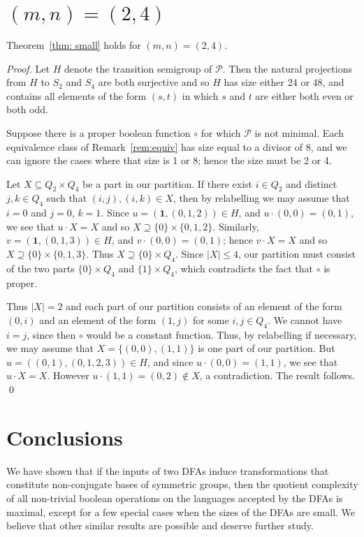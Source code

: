 \documentclass{llncs}
\newcommand{\cP}{{\mathcal P}}
\newcommand{\one}{{\mathbf 1}}
\begin{document}
\section{$(m,n)=(2,4)$}
\begin{proposition}
Theorem~\ref{thm: small} holds for $(m,n)=(2,4)$.
\end{proposition}
\begin{proof}
Let $H$ denote the transition semigroup of $\cP$.  Then the natural projections from $H$ to $S_2$ and $S_4$ are both surjective and so $H$ has size either $24$ or $48$, and  contains all elements of the form $(s,t)$ in which $s$ and $t$ are either both even or both odd.

Suppose there is a proper boolean function $\circ$ for which $\cP$ is not minimal.  
Each equivalence class of Remark~\ref{rem:equiv} has size equal to a divisor of $8$, and we can ignore the cases where that size is 1 or 8; hence the size must be 2 or 4. 

Let $X\subseteq Q_2\times Q_4$ be a part in our partition.  
If there exist $i\in Q_2$ and distinct $j,k\in Q_4$ such that $(i,j),(i,k)\in X$, then by relabelling we may assume that $i=0$ and $j=0$, $k=1$.  
Since $u=(\one, (0,1,2))\in H$, and $u\cdot (0,0)=(0,1)$, we see that $u\cdot X=X$ and so $X\supseteq \{0\}\times \{0,1,2\}$.  
Similarly, $v=(\one, (0,1,3))\in H$, and $v\cdot (0,0)=(0,1)$; hence $v\cdot X=X$ and so $X\supseteq \{0\}\times \{0,1,3\}$.  
Thus $X\supseteq \{0\}\times Q_4$.  
Since $|X|\le 4$, our partition must consist of the two parts $\{0\}\times Q_4$ and $\{1\}\times Q_4$, which contradicts the fact that $\circ$ is proper.  

Thus  $|X|=2$ and each part of our partition consists of an element of the form $(0,i)$ and an element of the form $(1,j)$ for some $i,j\in Q_4$.  We  cannot have $i=j$, since then  $\circ$ would be a constant function.  Thus, by relabelling if necessary, we may assume that $X=\{(0,0),(1,1)\}$ is one part of our partition.  But $u=((0,1),(0,1,2,3))\in H$, and since $u\cdot (0,0)=(1,1)$, we see that $u\cdot X=X$.  However $u\cdot (1,1)=(0,2)\not\in X$, a contradiction.  The result follows.
\qed
\end{proof}
\section{Conclusions}
\label{sec:conc}
We have shown that if the inputs of two DFAs induce transformations that constitute non-conjugate bases of symmetric groups, then the quotient complexity of all non-trivial boolean operations on the languages accepted by the DFAs is maximal, except for a few special cases when the sizes of the DFAs are small. We believe that other similar results are possible and deserve further study.
\smallskip 
\end{document}
